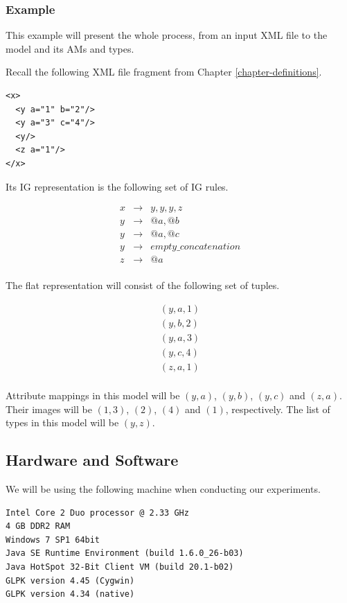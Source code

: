 \subsubsection{Example}

This example will present the whole process, from an input XML file to the model and its AMs and types.

Recall the following XML file fragment from Chapter \ref{chapter-definitions}.
\begin{verbatim}
<x>
  <y a="1" b="2"/>
  <y a="3" c="4"/>
  <y/>
  <z a="1"/>
</x>
\end{verbatim}

Its IG representation is the following set of IG rules.

\begin{eqnarray*}
	x & \to & y, y, y, z \\
	y & \to & @a, @b \\
	y & \to & @a, @c \\
	y & \to & empty\_concatenation \\
	z & \to & @a \\
\end{eqnarray*}

The flat representation will consist of the following set of tuples.

\begin{eqnarray*}
(y, a, 1) \\
(y, b, 2) \\
(y, a, 3) \\
(y, c, 4) \\
(z, a, 1) \\
\end{eqnarray*}

Attribute mappings in this model will be $(y, a)$, $(y, b)$, $(y,c)$ and $(z,a)$. Their images will be $(1,3)$, $(2)$, $(4)$ and $(1)$, respectively. The list of types in this model will be $(y,z)$.

\subsection{Hardware and Software}

We will be using the following machine when conducting our experiments.

\begin{verbatim}
Intel Core 2 Duo processor @ 2.33 GHz
4 GB DDR2 RAM
Windows 7 SP1 64bit
Java SE Runtime Environment (build 1.6.0_26-b03)
Java HotSpot 32-Bit Client VM (build 20.1-b02)
GLPK version 4.45 (Cygwin)
GLPK version 4.34 (native)
\end{verbatim}


